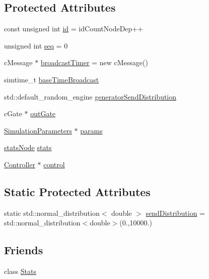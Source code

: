 \subsection*{Protected Attributes}
\begin{DoxyCompactItemize}
\item 
const unsigned int \hyperlink{class_node_base_a2924723bf530b8304c5e028504aafd84}{id} = id\+Count\+Node\+Dep++
\item 
unsigned int \hyperlink{class_node_base_a4fe5b1b7aeb49d15ec7986133346aeb7}{seq} = 0
\item 
c\+Message $\ast$ \hyperlink{class_node_base_a8b7bd31bf2bef92de75a2b565c42fd8a}{broadcast\+Timer} = new c\+Message()
\item 
simtime\+\_\+t \hyperlink{class_node_base_a199676fc8bd0203c7241f58779c5921c}{base\+Time\+Broadcast}
\item 
std\+::default\+\_\+random\+\_\+engine \hyperlink{class_node_base_a2c488fd8adf4d208593a6e6eba4d6220}{generator\+Send\+Distribution}
\item 
c\+Gate $\ast$ \hyperlink{class_node_base_a2e86bd53e181f8b488130032da547f8e}{out\+Gate}
\item 
\hyperlink{class_simulation_parameters}{Simulation\+Parameters} $\ast$ \hyperlink{class_node_base_aa6fb61208e4f5b7a841cd46fac297058}{params}
\item 
\hyperlink{_node_base_8h_a6d83bdf09c8e309d31f9330091b0d10d}{stats\+Node} \hyperlink{class_node_base_a12b20bca634637499bf55020c398424e}{stats}
\item 
\hyperlink{class_controller}{Controller} $\ast$ \hyperlink{class_node_base_a89bfb79efc25d9508eb15a4184558c41}{control}
\end{DoxyCompactItemize}
\subsection*{Static Protected Attributes}
\begin{DoxyCompactItemize}
\item 
static std\+::normal\+\_\+distribution$<$ double $>$ \hyperlink{class_node_base_ab8e4cc30083c58d14b22d928a78cb8ac}{send\+Distribution} = std\+::normal\+\_\+distribution$<$double$>$(0.,10000.)
\end{DoxyCompactItemize}
\subsection*{Friends}
\begin{DoxyCompactItemize}
\item 
class \hyperlink{class_node_base_a129f65b6976377739eb6231b6962985e}{Stats}
\end{DoxyCompactItemize}


